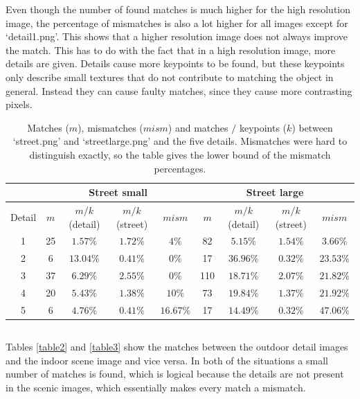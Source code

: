 \documentclass{article}
\begin{document}
Even though the number of found matches is much higher for the high resolution image, the percentage of mismatches is also a lot higher for all images except for `detail1.png'. This shows that a higher resolution image does not always improve the match. This has to do with the fact that in a high resolution image, more details are given. Details cause more keypoints to be found, but these keypoints only describe small textures that do not contribute to matching the object in general. Instead they can cause faulty matches, since they cause more contrasting pixels.

\begin{table}[H]
 \centering
 \caption{Matches ($m$), mismatches ($mism$) and matches $/$ keypoints ($k$) between `street.png' and `streetlarge.png' and the five details. Mismatches were hard to distinguish exactly, so the table gives the lower bound of the mismatch percentages.}
 \label{table1}
 \begin{tabular}{|c|c|c|c|c||c|c|c|c|}
 \hline
 & \multicolumn{4}{c||}{Street small} & \multicolumn{4}{c|}{Street large} \\
 \hline
  Detail & $m$ & $m/k$ (detail) & $m/k$(street) & $mism$ & $m$ & $m/k$ (detail) & $m/k$(street) & $mism$ \\
  \hline
  1 & 25 & $1.57\%$ & $1.72\%$ & $4\%$ & 82 & $5.15\%$ & $1.54\%$ & $3.66\%$ \\
  2 & 6 & $13.04\%$ & $0.41\%$ & $0\%$ & 17 & $36.96\%$ & $0.32\%$ & $23.53\%$ \\
  3 & 37 & $6.29\%$ & $2.55\%$ & $0\%$ & 110 & $18.71\%$ & $2.07\%$ & $21.82\%$ \\
  4 & 20 & $5.43\%$ & $1.38\%$ & $10\%$ & 73 & $19.84\%$ & $1.37\%$ & $21.92\%$ \\
  5 & 6 & $4.76\%$ & $0.41\%$ & $16.67\%$ & 17 & $14.49\%$ & $0.32\%$ & $47.06\%$ \\
  \hline
 \end{tabular}
\end{table}

\subsection{}
Tables \ref{table2} and \ref{table3} show the matches between the outdoor detail images and the indoor scene image and vice versa. In both of the situations a small number of matches is found, which is logical because the details are not present in the scenic images, which essentially makes every match a mismatch. 
\end{document}
